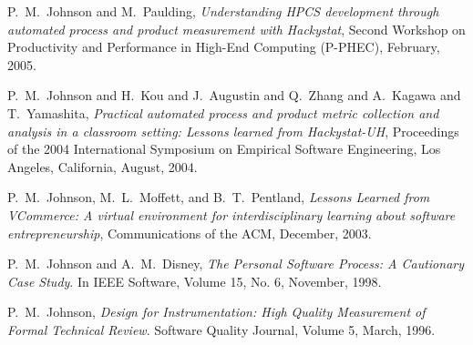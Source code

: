 \documentclass[11pt]{article}
\begin{document}
\begin{Publications: Other Significant}

\item P.~M.~Johnson and M.~Paulding, {\em Understanding HPCS development
through automated process and product measurement with Hackystat}, Second
Workshop on Productivity and Performance in High-End Computing (P-PHEC),
February, 2005.

\item P.~M.~Johnson and H.~Kou and J.~Augustin and Q.~Zhang and A.~Kagawa
and T.~Yamashita, {\em Practical automated process and product metric
collection and analysis in a classroom setting: Lessons learned from
Hackystat-UH}, Proceedings of the 2004 International Symposium on Empirical
Software Engineering, Los Angeles, California, August, 2004.

\item P.~M.~Johnson, M.~L.~Moffett, and B.~T.~Pentland, {\em Lessons
Learned from VCommerce: A virtual environment for interdisciplinary
learning about software entrepreneurship}, Communications of
the ACM, December, 2003.

\item P.~M.~Johnson and A.~M.~Disney, {\em The Personal Software Process: A
    Cautionary Case Study}.  In IEEE Software, Volume 15, No. 6, November,
  1998.

\item P.~M.~Johnson, {\em Design for Instrumentation: High Quality
    Measurement of Formal Technical Review}.  Software Quality Journal,
  Volume 5, March, 1996.

\end{Publications: Other Significant}
\end{document}
